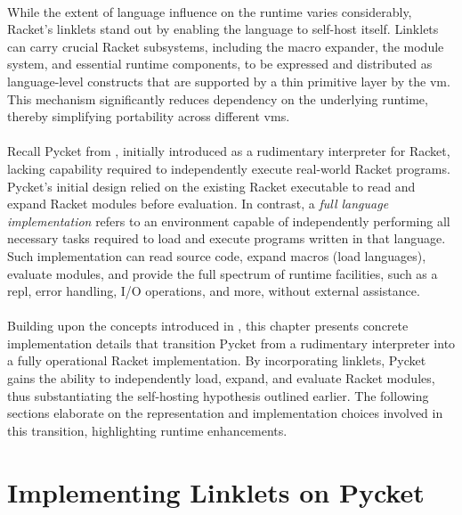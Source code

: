	\paragraph{}%
		While the extent of language influence on the runtime varies considerably, Racket's linklets stand out by enabling the language to self-host itself. Linklets can carry crucial Racket subsystems, including the macro expander, the module system, and essential runtime components, to be expressed and distributed as language-level constructs that are supported by a thin primitive layer by the \gls{vm}. This mechanism significantly reduces dependency on the underlying runtime, thereby simplifying portability across different \glspl{vm}.

	\paragraph{}%
		Recall Pycket from , initially introduced as a rudimentary interpreter for Racket, lacking capability required to independently execute real-world Racket programs. Pycket's initial design relied on the existing Racket executable to read and expand Racket modules before evaluation. In contrast, a \emph{full language implementation} refers to an environment capable of independently performing all necessary tasks required to load and execute programs written in that language. Such implementation can read source code, expand macros (load languages), evaluate modules, and provide the full spectrum of runtime facilities, such as a \gls{repl}, error handling, I/O operations, and more, without external assistance.

	\paragraph{}%
		Building upon the concepts introduced in , this chapter presents concrete implementation details that transition Pycket from a rudimentary interpreter into a fully operational Racket implementation. By incorporating linklets, Pycket gains the ability to independently load, expand, and evaluate Racket modules, thus substantiating the self-hosting hypothesis outlined earlier. The following sections elaborate on the representation and implementation choices involved in this transition, highlighting runtime enhancements.

	\section[\texorpdfstring{Implementing Linklets on Pycket}{Linklets on Pycket}]{Implementing Linklets on Pycket}

